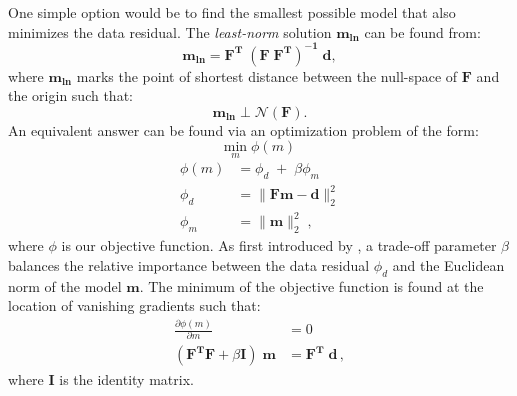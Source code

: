One simple option would be to find the smallest possible model that also minimizes the data residual. 
The \emph{least-norm} solution $\mathbf{m_{ln}}$ can be found from:
 \begin{equation}\label{eq:LeastNorm}
\mathbf{m_{ln}  = F^T \; (F\;F^T)^{-1} \; d},
\end{equation}
where $\mathbf{m_{ln}}$ marks the point of shortest distance between the null-space of $\mathbf{F}$ and the origin such that:
\begin{equation}
	\mathbf{m_{ln}} \perp  \mathcal{N} (\mathbf{F}).
\end{equation}
An equivalent answer can be found via an optimization problem of the form:
\begin{equation} \label{eq:obj_func}
\underset{m}{\text{min}} \; \phi(m)
\end{equation}
\begin{equation*}
\begin{split}
	\phi(m) & = \phi_d \;+\; \beta \phi_m \\
	\phi_d &= \|\mathbf{ Fm - d }\|_2^{2} \\
	\phi_m &= \| \mathbf{m} \|_2^2\; ,
\end{split}
\end{equation*}
where $\phi$ is our objective function.
As first introduced by \cite{TikhonovArsenin77},  a trade-off parameter $\beta$ balances the relative importance between the data residual $\phi_d$ and the Euclidean norm of the model $\mathbf{m}$. 
The minimum of the objective function is found at the location of vanishing gradients such that:
\begin{equation}\label{eq:dphi_dm}
\begin{split}
\frac{\partial \phi(m)}{\partial m} &= 0 \\
 (\mathbf{F^TF} + \beta \mathbf{I}) \; \mathbf{m} &= \mathbf{F^T \; d} \, ,
 \end{split}
\end{equation}
where \textbf{I} is the identity matrix.

